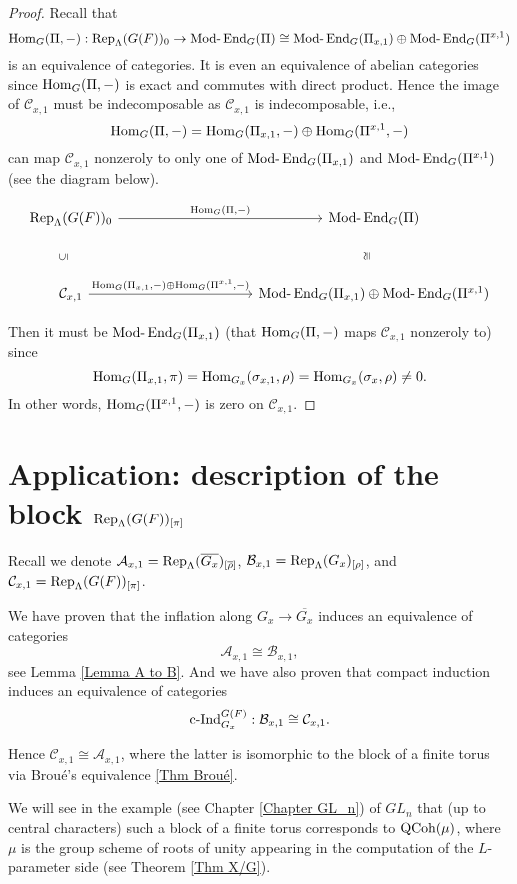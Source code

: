		\begin{proof}
			Recall that 
			$$\operatorname{\operatorname{Hom}}_G(\Pi, -): \operatorname{\operatorname{Rep}}_{\Lambda}(G(F))_0 \to \operatorname{Mod-}\operatorname{\operatorname{End}}_G(\Pi) \cong \operatorname{Mod-}\operatorname{\operatorname{End}}_G(\Pi_{x,1}) \oplus \operatorname{Mod-}\operatorname{\operatorname{End}}_G(\Pi^{x,1})$$ 
			is an equivalence of categories. It is even an equivalence of abelian categories since $\operatorname{\operatorname{Hom}}_G(\Pi, -)$ is exact and commutes with direct product. Hence the image of $\mathcal{C}_{x,1}$ must be indecomposable as $\mathcal{C}_{x,1}$ is indecomposable, i.e., 
			$$\operatorname{\operatorname{Hom}}_G(\Pi, -)=\operatorname{\operatorname{Hom}}_G(\Pi_{x,1}, -) \oplus \operatorname{\operatorname{Hom}}_G(\Pi^{x,1}, -)$$
			can map $\mathcal{C}_{x,1}$ nonzeroly to only one of $\operatorname{Mod-}\operatorname{\operatorname{End}}_G(\Pi_{x,1})$ and $\operatorname{Mod-}\operatorname{\operatorname{End}}_G(\Pi^{x,1})$ (see the diagram below). 
			
			\[\begin{tikzcd}
				{\Rep_{\Lambda}(G(F))_0} &&&& {\Modr \End_G(\Pi)} \\
				\\
				{\mathcal{C}_{x,1}} &&&& {\Modr \End_G(\Pi_{x,1}) \oplus \Modr \End_G(\Pi^{x,1})}
				\arrow["{\Hom_G(\Pi, -)}", from=1-1, to=1-5]
				\arrow["{\Hom_G(\Pi_{x,1}, -) \oplus \Hom_G(\Pi^{x,1}, -)}", from=3-1, to=3-5]
				\arrow["\subseteq", sloped, draw=none, from=3-1, to=1-1]
				\arrow["\cong", sloped, draw=none, from=3-5, to=1-5]
			\end{tikzcd}\]
			
			Then it must be $\operatorname{Mod-}\operatorname{\operatorname{End}}_G(\Pi_{x,1})$ (that $\operatorname{\operatorname{Hom}}_G(\Pi, -)$ maps $\mathcal{C}_{x,1}$ nonzeroly to) since 
			$$\operatorname{\operatorname{Hom}}_G(\Pi_{x,1}, \pi)=\operatorname{\operatorname{Hom}}_{G_x}(\sigma_{x,1}, \rho)=\operatorname{\operatorname{Hom}}_{G_x}(\sigma_x, \rho) \neq 0.$$
			In other words, $\operatorname{\operatorname{Hom}}_G(\Pi^{x,1}, -)$ is zero on $\mathcal{C}_{x,1}$.
			
		\end{proof}
		
		
		\section{Application: description of the block $\operatorname{\operatorname{Rep}}_{\Lambda}(G(F))_{[\pi]}$}\label{Section rep application}
		
		Recall we denote $\mathcal{A}_{x,1}=\operatorname{\operatorname{Rep}}_{\Lambda}(\overline{G_x})_{[\overline{\rho}]}$, $\mathcal{B}_{x,1}=\operatorname{\operatorname{Rep}}_{\Lambda}(G_x)_{[\rho]}$, and $\mathcal{C}_{x,1}=\operatorname{\operatorname{Rep}}_{\Lambda}(G(F))_{[\pi]}$.
		
		We have proven that the inflation along $G_x \to \overline{G_x}$ induces an equivalence of categories 
		$$\mathcal{A}_{x,1} \cong \mathcal{B}_{x,1},$$
		see Lemma \ref{Lemma A to B}. And we have also proven that compact induction induces an equivalence of categories
		$$\operatorname{\operatorname{c-Ind}}_{G_x}^{G(F)}: \mathcal{B}_{x,1} \cong \mathcal{C}_{x,1}.$$
		
		Hence $\mathcal{C}_{x,1} \cong \mathcal{A}_{x,1}$, where the latter is isomorphic to the block of a finite torus via Broué's equivalence \ref{Thm Broué}.
		
		We will see in the example (see Chapter \ref{Chapter GL_n}) of $GL_n$ that (up to central characters) such a block of a finite torus corresponds to $\operatorname{\operatorname{QCoh}}(\mu)$, where $\mu$ is the group scheme of roots of unity appearing in the computation of the $L$-parameter side (see Theorem \ref{Thm X/G}).
		

	